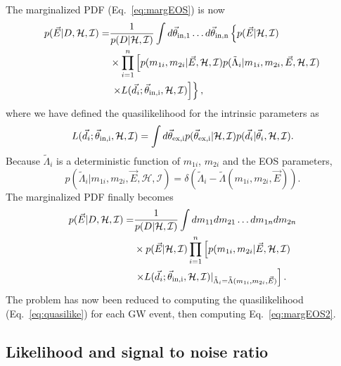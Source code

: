 \documentclass[twocolumn,prd,amssymb,aps,nofootinbib,showpacs,epsf]{revtex4}
\begin{document}
The marginalized PDF (Eq.~\eqref{eq:margEOS}) is now
\begin{equation}
\begin{split}
p(\vec E | D,\mathcal{H},\mathcal{I}) = &\frac{1}{p(D | \mathcal{H},\mathcal{I})} 
\int d\vec\theta_{\rm in, 1} \dots d\vec\theta_{\rm in, n} \left\{ p(\vec E | \mathcal{H},\mathcal{I}) \right. \\
& \times \prod_{i=1}^n \left[p(m_{1i}, m_{2i} | \vec E, \mathcal{H},\mathcal{I}) p(\tilde\Lambda_i | m_{1i}, m_{2i}, \vec E, \mathcal{H},\mathcal{I}) \right.\\
& \left.\left. \times L(\vec d_i; \vec\theta_{\rm in, i}, \mathcal{H}, \mathcal{I}) \right]\right\},
\end{split}
\end{equation}
where we have defined the quasilikelihood for the intrinsic parameters as
\begin{equation}
\label{eq:quasilike}
L(\vec d_i; \vec\theta_{\rm in, i}, \mathcal{H}, \mathcal{I}) = \int d\vec\theta_{\rm ex, i} p(\vec\theta_{\rm ex, i} | \mathcal{H}, \mathcal{I}) p(\vec d_i | \vec\theta_i,\mathcal{H},\mathcal{I}).
\end{equation}
Because $\tilde\Lambda_i$ is a deterministic function of $m_{1i}$, $m_{2i}$ and the EOS parameters,
\begin{equation}
p(\tilde\Lambda_i | m_{1i}, m_{2i}, \vec E, \mathcal{H},\mathcal{I}) = \delta(\tilde\Lambda_i - \tilde\Lambda(m_{1i}, m_{2i}, \vec E)).
\end{equation}
The marginalized PDF finally becomes
\begin{equation}
\label{eq:margEOS2}
\begin{split}
p(\vec E | D,\mathcal{H},\mathcal{I}) =& \frac{1}{p(D | \mathcal{H},\mathcal{I})} \int dm_{11} dm_{21} \dots dm_{1n} dm_{2n} \\
&\times p(\vec E | \mathcal{H},\mathcal{I}) \prod_{i=1}^n \left[ p(m_{1i}, m_{2i} | \vec E, \mathcal{H},\mathcal{I}) \right.\\
& \left. \times L(\vec d_i; \vec\theta_{\rm in, i}, \mathcal{H}, \mathcal{I})|_{\tilde\Lambda_i = \tilde\Lambda(m_{1i}, m_{2i}, \vec E)} \right].
\end{split}
\end{equation}
The problem has now been reduced to computing the quasilikelihood (Eq.~\eqref{eq:quasilike}) for each GW event, then computing Eq.~\eqref{eq:margEOS2}.

\subsection{Likelihood and signal to noise ratio}
\end{document}
